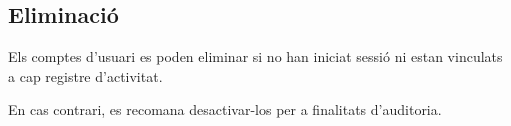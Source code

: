 \documentclass[a4paper]{article}
\begin{document}
\hypertarget{toc185}{}
\subsection{Eliminació}

Els comptes d'usuari es poden eliminar si no han iniciat sessió ni estan vinculats a cap registre d'activitat.

En cas contrari, es recomana desactivar-los per a finalitats d'auditoria.

\end{document}
